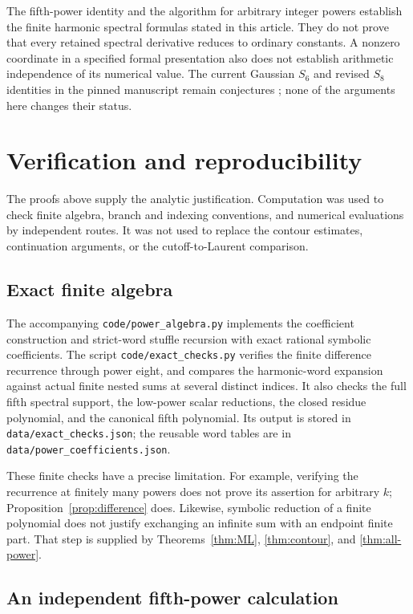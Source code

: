 \documentclass[11pt,a4paper]{article}
\numberwithin{equation}{section}
\theoremstyle{definition}
\theoremstyle{remark}
\begin{document}
The fifth-power identity and the algorithm for arbitrary integer
powers establish the finite harmonic spectral formulas stated in
this article. They do not prove that every retained spectral
derivative reduces to ordinary constants. A nonzero coordinate in a
specified formal presentation also does not establish arithmetic
independence of its numerical value. The current Gaussian
\(S_6\) and revised \(S_8\) identities in the pinned manuscript
remain conjectures \cite{Repo}; none of the arguments here changes
their status.

\section{Verification and reproducibility}
\label{sec:verification}

The proofs above supply the analytic justification.  Computation was
used to check finite algebra, branch and indexing conventions, and
numerical evaluations by independent routes.  It was not used to
replace the contour estimates, continuation arguments, or the
cutoff-to-Laurent comparison.

\subsection{Exact finite algebra}

The accompanying \texttt{code/power\_algebra.py} implements the coefficient
construction and strict-word stuffle recursion with exact rational
symbolic coefficients.  The script \texttt{code/exact\_checks.py}
verifies the finite difference recurrence through power eight, and
compares the harmonic-word expansion against actual finite nested
sums at several distinct indices.  It also checks the full fifth
spectral support, the low-power scalar reductions, the closed residue
polynomial, and the canonical fifth polynomial.  Its output is stored
in \texttt{data/exact\_checks.json}; the reusable word tables are in
\texttt{data/power\_coefficients.json}.

These finite checks have a precise limitation.  For example, verifying
the recurrence at finitely many powers does not prove its assertion
for arbitrary $k$; Proposition~\ref{prop:difference} does.  Likewise,
symbolic reduction of a finite polynomial does not justify exchanging
an infinite sum with an endpoint finite part.  That step is supplied
by Theorems~\ref{thm:ML}, \ref{thm:contour}, and \ref{thm:all-power}.

\subsection{An independent fifth-power calculation}
\end{document}
